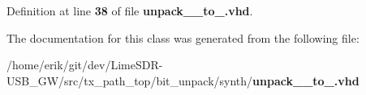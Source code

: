 Definition at line {\bf 38} of file {\bf unpack\+\_\+\_\+to\+\_.\+vhd}.



The documentation for this class was generated from the following file\+:\begin{DoxyCompactItemize}
\item 
/home/erik/git/dev/\+Lime\+S\+D\+R-\/\+U\+S\+B\+\_\+\+G\+W/src/tx\+\_\+path\+\_\+top/bit\+\_\+unpack/synth/{\bf unpack\+\_\+\_\+to\+\_.\+vhd}\end{DoxyCompactItemize}
